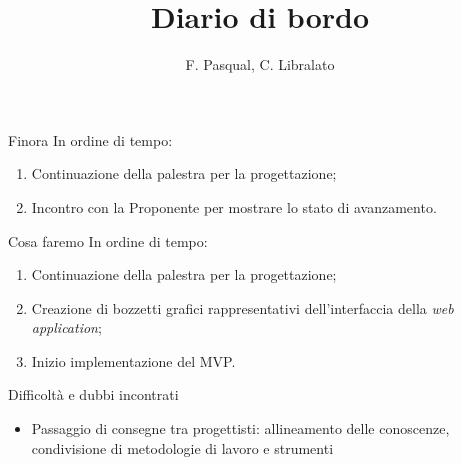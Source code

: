 \documentclass{beamer}
\title{Diario di bordo}
\author[F. Pasqual, C. Libralato]{F. Pasqual, C. Libralato}
\begin{document}
{
\begin{frame}
    \titlepage
\end{frame}
}

\begin{frame}{Finora}
    In ordine di tempo:
    \begin{enumerate}
        \item Continuazione della palestra per la progettazione;
        \item Incontro con la Proponente per mostrare lo stato di avanzamento.
    \end{enumerate}
\end{frame}

\begin{frame}{Cosa faremo}
    In ordine di tempo:
    \begin{enumerate}
        \item Continuazione della palestra per la progettazione;
        \item Creazione di bozzetti grafici rappresentativi dell'interfaccia della \textit{web application};
        \item Inizio implementazione del MVP.
    \end{enumerate}
\end{frame}


\begin{frame}{Difficoltà e dubbi incontrati}
    \begin{center}
        \begin{itemize}
            \item Passaggio di consegne tra progettisti: allineamento delle conoscenze, condivisione di metodologie di lavoro e strumenti
        \end{itemize}
    \end{center}
\end{frame}
\end{document}

